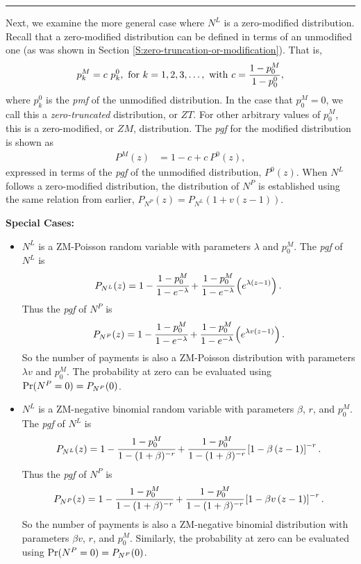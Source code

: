 \documentclass[]{book}
\theoremstyle{definition}
\theoremstyle{definition}
\theoremstyle{definition}
\theoremstyle{remark}
\begin{document}
\begin{center}\rule{0.5\linewidth}{\linethickness}\end{center}

Next, we examine the more general case where \(N^L\) is a zero-modified
distribution. Recall that a zero-modified distribution can be defined in
terms of an unmodified one (as was shown in Section
\ref{S:zero-truncation-or-modification}). That is, \[\begin{aligned}
p_k^M = c~p_k^0, {~\rm for~} k=1,2,3,\ldots,  {~\rm with~}c = \frac{1-p_0^M}{1-p_0^0},
\end{aligned}\] where \(p^0_k\) is the \emph{pmf} of the unmodified
distribution. In the case that \(p_0^M=0\), we call this a
\emph{zero-truncated} distribution, or \(ZT\). For other arbitrary
values of \(p_0^M\), this is a zero-modified, or \(ZM\), distribution.
The \emph{pgf} for the modified distribution is shown as
\[\begin{aligned}
P^M(z) &= 1-c+c~P^0(z),
\end{aligned}\] expressed in terms of the \emph{pgf} of the unmodified
distribution, \(P^0(z)\). When \(N^L\) follows a zero-modified
distribution, the distribution of \(N^P\) is established using the same
relation from earlier, \(P_{N^P}(z)=P_{N^L}\left(1+v(z-1)\right)\).

\textbf{Special Cases:}

\begin{itemize}
\item
  \(N^{L}\) is a ZM-Poisson random variable with parameters \(\lambda\)
  and \(p_0^{M}\). The \emph{pgf} of \(N^L\) is
  \[P_{N^{L}}(z)=1-\cfrac{1-p_0^{M}}{1-e^{-\lambda}}+\cfrac{1-p_0^{M}}{1-e^{-\lambda}}\left( e^{\lambda(z-1)} \right).\]
  Thus the \emph{pgf} of \(N^P\) is
  \[P_{N^{P}}(z)=1-\cfrac{1-p_0^{M}}{1-e^{-\lambda}}+\cfrac{1-p_0^{M}}{1-e^{-\lambda}}\left( e^{\lambda v(z-1)} \right).\]
  So the number of payments is also a ZM-Poisson distribution with
  parameters \(\lambda v\) and \(p_0^{M}\). The probability at zero can
  be evaluated using \({\rm Pr}(N^P=0) = P_{N^P}(0)\).
\item
  \(N^{L}\) is a ZM-negative binomial random variable with parameters
  \(\beta\), \(r\), and \(p_0^{M}\). The \emph{pgf} of \(N^L\) is
  \[P_{N^{L}}(z)=1-\cfrac{1-p_0^{M}}{1-(1+\beta)^{-r}}+\cfrac{1-p_0^{M}}{1-(1+\beta)^{-r}}\left[ 1-\beta \left( z-1\right)\right]^{-r}.\]
  Thus the \emph{pgf} of \(N^P\) is
  \[P_{N^{P}}(z)=1-\cfrac{1-p_0^{M}}{1-(1+\beta)^{-r}}+\cfrac{1-p_0^{M}}{1-(1+\beta)^{-r}}\left[ 1-\beta v\left( z-1\right)\right]^{-r}.\]
  So the number of payments is also a ZM-negative binomial distribution
  with parameters \(\beta v\), \(r\), and \(p_0^{M}\). Similarly, the
  probability at zero can be evaluated using
  \({\rm Pr}(N^P=0) = P_{N^P}(0)\).
\end{itemize}
\end{document}
